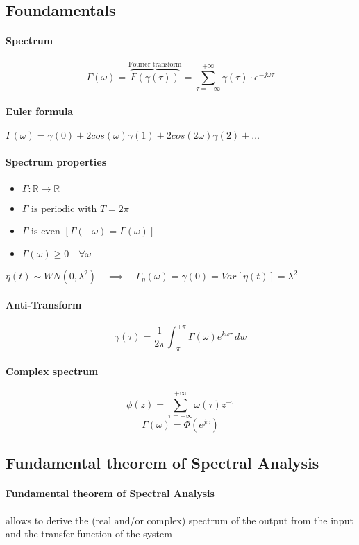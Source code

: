 \documentclass{report}
\newcommand{\R}{\mathbb{R}}
\begin{document}
\subsection{Foundamentals}
\paragraph{Spectrum} \[
\Gamma(\omega)=\overbrace{F(\gamma(\tau))}^\text{Fourier transform}=\sum_{\tau=-\infty}^{+\infty}\gamma(\tau)\cdot e^{-j\omega\tau}
\]
\paragraph{Euler formula} $\Gamma(\omega)=\gamma(0)+2cos(\omega)\gamma(1)+2cos(2\omega)\gamma(2)+\dots$
\paragraph{Spectrum properties} 
\begin{itemize}
	\item $\Gamma: \R \to \R$
	\item $\Gamma\text{ is periodic with }T=2\pi$
	\item $\Gamma\text{ is even }[\Gamma(-\omega)=\Gamma(\omega)]$
	\item $\Gamma(\omega)\geq 0 \quad \forall\omega$
\end{itemize}
$\eta(t) \sim WN(0,\lambda^2) \quad\implies\quad \Gamma_\eta(\omega)=\gamma(0)=Var[\eta(t)]=\lambda^2$
\paragraph{Anti-Transform}
\[
\gamma(\tau)=\frac{1}{2\pi}\int_{-\pi}^{+\pi} \Gamma(\omega)e^{k\omega\tau}\,dw
\]
\paragraph{Complex spectrum}
\[
\phi(z)=\sum_{\tau =-\infty}^{+\infty} \omega(\tau)z^{-\tau}
\]
\[
\Gamma(\omega)=\Phi(e^{j\omega})
\]

\subsection{Fundamental theorem of Spectral Analysis} 

\paragraph{Fundamental theorem of Spectral Analysis} allows to derive the (real and/or complex) spectrum of the output from  the input and the transfer function of the system
\end{document}
